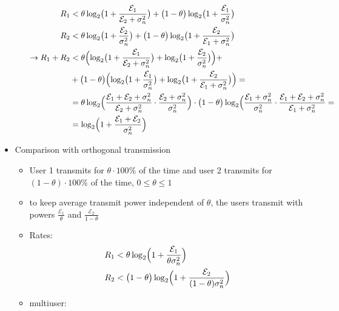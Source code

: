 \documentclass[a4paper, 10pt]{article}
\begin{document}
\begin{itemize}
\begin{itemize}
		\begin{align*}
			R_1 &< \theta\log_2\bigl(1 + \frac{\mathcal{E}_1}{\mathcal{E}_2 + \sigma_n^2}\bigr) + \bigl(1-\theta\bigr)\log_2\bigl(1 + \frac{\mathcal{E}_1}{\sigma_n^2}\bigr)\\
			R_2 &< \theta\log_2\bigl(1 + \frac{\mathcal{E}_2}{\sigma_n^2}\bigr) + \bigl(1-\theta\bigr)\log_2\bigl(1 + \frac{\mathcal{E}_2}{\mathcal{E}_1 + \sigma_n^2}\bigr)\\
			\rightarrow R_1 + R_2 &< \theta\Bigl(\log_2\bigl( 1 + \frac{\mathcal{E}_1}{\mathcal{E}_2 + \sigma_n^2}\bigr) + \log_2\bigl(1 + \frac{\mathcal{E}_2}{\sigma_n^2}\bigr)\Bigr) + \\ &+ \bigl( 1- \theta\bigr) \Bigl(\log_2\bigl(1 + \frac{\mathcal{E}_1}{\sigma_n^2}\bigr) + \log_2\bigl(1 + \frac{\mathcal{E}_2}{\mathcal{E}_1 + \sigma_n^2}\bigr)\Bigr) = \\ &= \theta\log_2\Bigl(\frac{\mathcal{E}_1 + \mathcal{E}_2 + \sigma_n^2}{\mathcal{E}_2 + \sigma_n^2}\cdot\frac{\mathcal{E}_2 + \sigma_n^2}{\sigma_n^2}\Bigr) \cdot\bigl(1 - \theta\bigr)\log_2\Bigl(\frac{\mathcal{E}_1 + \sigma_n^2}{\sigma_n^2} \cdot\frac{\mathcal{E}_1 + \mathcal{E}_2 + \sigma_n^2}{\mathcal{E}_1 + \sigma_n^2} = \\ &= \log_2\Bigl( 1 + \frac{\mathcal{E}_1 + \mathcal{E}_2}{\sigma_n^2}\Bigr)
		\end{align*}
	\end{itemize}
	\item Comparison with orthogonal transmission
	\begin{itemize}
		\item User 1 transmits for $\theta\cdot 100\% $ of the time and user 2 transmits for $(1-\theta)\cdot 100\%  $ of the time, $0\leq \theta\leq 1 $
		\item to keep average transmit power independent of $\theta$, the users transmit with powers $\frac{\mathcal{E}_1}{\theta} $ and $\frac{\mathcal{E}_2}{1 - \theta} $ 
		\item Rates: 
		\begin{align*}
			R_1 &< \theta\log_2\Bigl( 1 + \frac{\mathcal{E}_1}{\theta\sigma_n^2}\Bigr)\\
			R_2 &< \bigl(1 - \theta\bigr)\log_2\Bigl( 1 + \frac{\mathcal{E}_2}{(1 - \theta)\sigma_n^2}\Bigr)
		\end{align*}
		\item[] multiuser:\\
\end{itemize}
\end{itemize}
\end{document}
